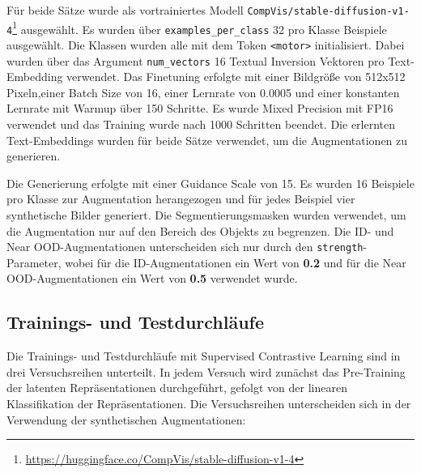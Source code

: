 Für beide Sätze wurde als vortrainiertes Modell \lstinline{CompVis/stable-diffusion-v1-4}\footnote{\url{https://huggingface.co/CompVis/stable-diffusion-v1-4}} ausgewählt. Es wurden über \lstinline{examples_per_class} 32 pro Klasse Beispiele ausgewählt. Die Klassen wurden alle mit dem Token \lstinline{<motor>} initialisiert. Dabei wurden über das Argument \lstinline{num_vectors} 16 Textual Inversion Vektoren pro Text-Embedding verwendet. Das Finetuning erfolgte mit einer Bildgröße von 512x512 Pixeln,einer Batch Size von 16, einer Lernrate von 0.0005 und einer konstanten Lernrate mit Warmup über 150 Schritte. Es wurde Mixed Precision mit FP16 verwendet und das Training wurde nach 1000 Schritten beendet. Die erlernten Text-Embeddings wurden für beide Sätze verwendet, um die Augmentationen zu generieren.

Die Generierung erfolgte mit einer Guidance Scale von 15. Es wurden 16 Beispiele pro Klasse zur Augmentation herangezogen und für jedes Beispiel vier synthetische Bilder generiert. Die Segmentierungsmasken wurden verwendet, um die Augmentation nur auf den Bereich des Objekts zu begrenzen. Die ID- und Near OOD-Augmentationen unterscheiden sich nur durch den \lstinline{strength}-Parameter, wobei für die ID-Augmentationen ein Wert von \textbf{0.2} und für die Near OOD-Augmentationen ein Wert von \textbf{0.5} verwendet wurde.

\subsection{Trainings- und Testdurchläufe} \label{subsec:supcon-setup}

Die Trainings- und Testdurchläufe mit Supervised Contrastive Learning sind in drei Versuchsreihen unterteilt. In jedem Versuch wird zunächst das Pre-Training der latenten Repräsentationen durchgeführt, gefolgt von der linearen Klassifikation der Repräsentationen. Die Versuchsreihen unterscheiden sich in der Verwendung der synthetischen Augmentationen:

